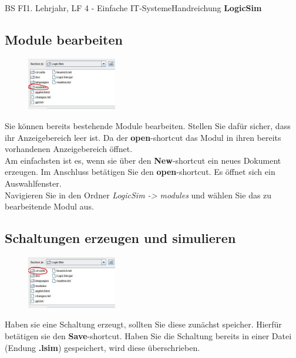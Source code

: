 \documentclass[11pt,oneside,openany,headings=optiontotoc,11pt,numbers=noenddot]{article}
\begin{document}
\begin{worksheet}{BS FI}{1. Lehrjahr, LF 4 - Einfache IT-Systeme}{Handreichung \textbf{LogicSim}}
		\subsection{Module bearbeiten}
		\begin{figure}
			\vspace{-10pt}
			\includegraphics[width=0.35\textwidth]{../99_Bilder/folder_mod.jpg}
		\end{figure}
		Sie können bereits bestehende Module bearbeiten. Stellen Sie dafür sicher, dass ihr Anzeigebereich leer ist. Da der \textbf{open}-shortcut das Modul in ihren bereits vorhandenen Anzeigebereich öffnet.\\
		Am einfachsten ist es, wenn sie über den \textbf{New}-shortcut ein neues Dokument erzeugen. Im Anschluss betätigen Sie den \textbf{open}-shortcut. Es öffnet sich ein Auswahlfenster.\\
		Navigieren Sie in den Ordner \textit{LogicSim -> modules} und wählen Sie das zu bearbeitende Modul aus.
		\subsection{Schaltungen erzeugen und simulieren}
		\begin{figure}
			\vspace{-10pt}
			\hspace{-25pt}
			\includegraphics[width=0.35\textwidth]{../99_Bilder/folder_circ.jpg}
		\end{figure}
		Haben sie eine Schaltung erzeugt, sollten Sie diese zunächst speicher. Hierfür betätigen sie den \textbf{Save}-shortcut. Haben Sie die Schaltung bereits in einer Datei (Endung \textbf{.lsim}) gespeichert, wird diese überschrieben.\\
		

\end{worksheet}
\end{document}
